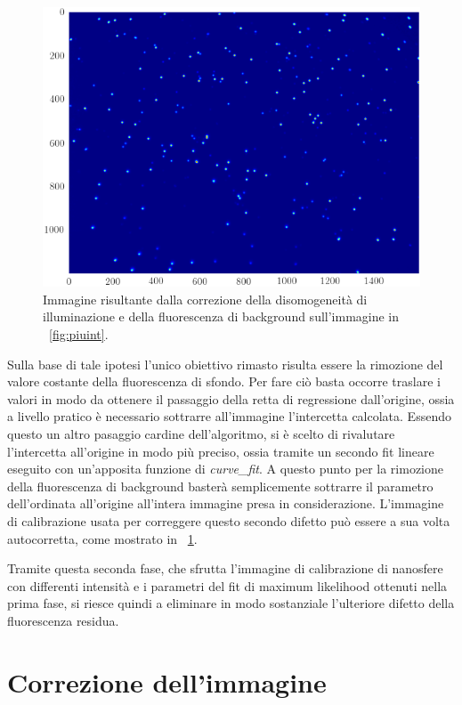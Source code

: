 \begin{figure}[p]
 \centering
 \includegraphics[scale=.64]{img/CAP3piuintcorr.png}
 \caption{\small{Immagine risultante dalla correzione della disomogeneità di illuminazione e della fluorescenza di background sull'immagine in \figurename~\ref{fig:piuint}.}}
 \label{fig:piuintcorr}
\end{figure}

Sulla base di tale ipotesi l'unico obiettivo rimasto risulta essere la rimozione del valore costante della fluorescenza di sfondo. 
Per fare ciò basta occorre traslare i valori in modo da ottenere il passaggio della retta di regressione dall'origine, ossia a livello pratico è necessario sottrarre all'immagine l'intercetta calcolata. 
Essendo questo un altro pasaggio cardine dell'algoritmo, si è scelto di rivalutare l'intercetta all'origine in modo più preciso, ossia tramite un secondo fit lineare eseguito con un'apposita funzione di \textit{curve\_fit}.
A questo punto per la rimozione della fluorescenza di background basterà semplicemente sottrarre il parametro dell'ordinata all'origine all'intera immagine presa in considerazione. 
L'immagine di calibrazione usata per correggere questo secondo difetto può essere a sua volta autocorretta, come mostrato in \figurename~\ref{fig:piuintcorr}.

Tramite questa seconda fase, che sfrutta l'immagine di calibrazione di nanosfere con differenti intensità e i parametri del fit di maximum likelihood ottenuti nella prima fase, si riesce quindi a eliminare in modo sostanziale l'ulteriore difetto della fluorescenza residua. 


\section{Correzione dell'immagine}

